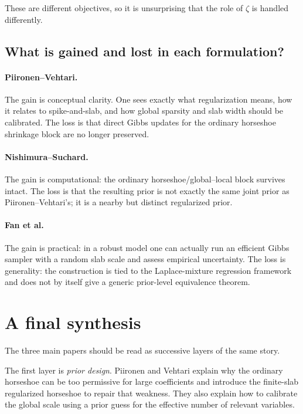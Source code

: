 \documentclass[11pt]{article}
\begin{document}
These are different objectives, so it is unsurprising that the role of $\zeta$ is handled differently.

\subsection{What is gained and lost in each formulation?}

\paragraph{Piironen--Vehtari.}
The gain is conceptual clarity. One sees exactly what regularization means, how it relates to spike-and-slab, and how global sparsity and slab width should be calibrated. The loss is that direct Gibbs updates for the ordinary horseshoe shrinkage block are no longer preserved.

\paragraph{Nishimura--Suchard.}
The gain is computational: the ordinary horseshoe/global--local block survives intact. The loss is that the resulting prior is not exactly the same joint prior as Piironen--Vehtari's; it is a nearby but distinct regularized prior.

\paragraph{Fan et al.}
The gain is practical: in a robust model one can actually run an efficient Gibbs sampler with a random slab scale and assess empirical uncertainty. The loss is generality: the construction is tied to the Laplace-mixture regression framework and does not by itself give a generic prior-level equivalence theorem.

\section{A final synthesis}

The three main papers should be read as successive layers of the same story.

The first layer is \emph{prior design}. Piironen and Vehtari explain why the ordinary horseshoe can be too permissive for large coefficients and introduce the finite-slab regularized horseshoe to repair that weakness. They also explain how to calibrate the global scale using a prior guess for the effective number of relevant variables.
\end{document}
